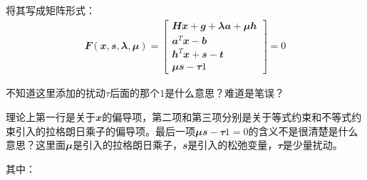 将其写成矩阵形式：
\begin{align}
  \mathbfit{F}(\mathbfit{x},\mathbfit{s},\mathbfit{\lambda},\mathbfit{\mu})=\begin{bmatrix}
    \mathbfit{H}\mathbfit{x}+\mathbfit{g}+\mathbfit{\lambda}\mathbfit{a}+\mathbfit{\mu}\mathbfit{h}\\
    \mathbfit{a}^T\mathbfit{x}-\mathbfit{b}\\
    \mathbfit{h}^T\mathbfit{x}+\mathbfit{s}-\mathbfit{t}\\
    \mathbfit{\mu}\mathbfit{s}-\mathbfit{\tau}\mathbfit{1}
  \end{bmatrix} = 0
\end{align}
\begin{note}
  不知道这里添加的扰动$\tau$后面的那个$1$是什么意思？难道是笔误？
  
  理论上第一行是关于$\mathbfit{x}$的偏导项，第二项和第三项分别是关于等式约束和不等式约束引入的拉格朗日乘子的偏导项。最后一项$\mathbfit{\mu}\mathbfit{s}-\mathbfit{\tau}\mathbfit{1}=0$的含义不是很清楚是什么意思？这里面$\mathbfit{\mu}$是引入的拉格朗日乘子，$\mathbfit{s}$是引入的松弛变量，$\mathbfit{\tau}$是少量扰动。


\end{note}
其中：
